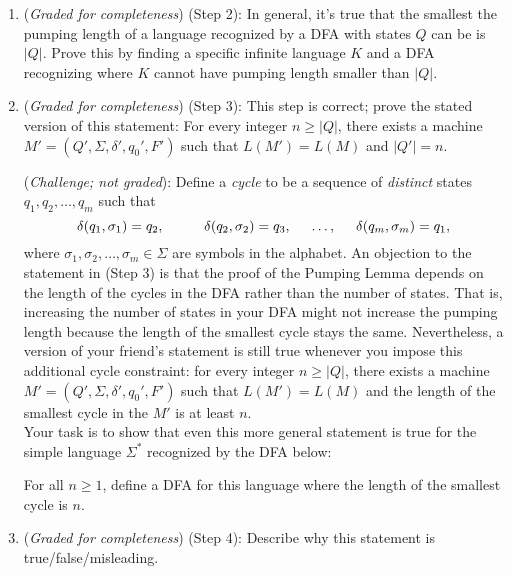 \documentclass[12pt, oneside]{article}
\newcommand{\gradeComplete}{({\it Graded for completeness}) }
\begin{document}
\begin{enumerate}
\begin{enumerate}
    \item\gradeComplete (Step 2): 
    In general, it's true that the smallest the pumping length of a language
    recognized by a DFA with states $Q$ can be is $|Q|$. Prove this by finding a specific infinite language $K$ and a DFA recognizing 
    where $K$ cannot have pumping length smaller than $|Q|$.

    \item\gradeComplete (Step 3): This step is correct;
    prove the stated version of this statement: For every integer $n \ge |Q|$, there 
    exists a machine $M' = (Q', \Sigma, \delta', q_0', F')$ such that $L(M') = L(M)$ and $|Q'| = n$.

    (\textit{Challenge; not graded}): 
    Define a \emph{cycle} to be a sequence of \emph{distinct} states $q_1, q_2, \ldots, q_m$ such that
	\[
	\delta(q_1, \sigma_1) = q_2, \hspace{1cm} \delta(q_2, \sigma_2) = q_3, \hspace{.5cm} \ldots, \hspace{.5cm}\delta(q_m, \sigma_m) = q_1, 
	\]
	where $\sigma_1, \sigma_2, \ldots, \sigma_m \in \Sigma$ are symbols in the alphabet. 
    An objection to the statement in (Step 3) is that the proof of the Pumping Lemma 
    depends on the length of the cycles in the DFA rather than the number of states. That is, 
    increasing the number of states in your DFA might not increase the pumping length because 
    the length of the smallest cycle stays the same. Nevertheless, a version of your friend's statement 
    is still true whenever you impose this additional cycle constraint:  for every integer $n \ge |Q|$, 
    there exists a machine $M' = (Q', \Sigma, \delta', q_0', F')$ such that $L(M') = L(M)$ and the length 
    of the smallest cycle in the $M'$ is at least $n$. \\

	Your task is to show that even this more general statement is true for the simple language $\Sigma^*$ 
    recognized by the DFA below:
	\begin{center}
    \end{center}
	For all $n \ge 1$, define a DFA for this language where the length of the smallest cycle is $n$.

    \item\gradeComplete (Step 4): Describe why this statement is true/false/misleading.
\end{enumerate}


\end{enumerate}
\end{document}
